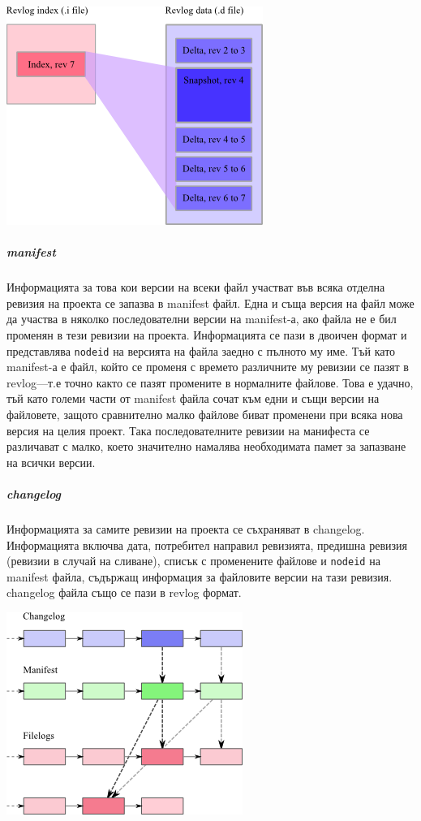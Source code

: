 \documentclass[a4paper]{article}
\begin{document}
    \includegraphics[scale=0.7]{hg_revlog}

    \subparagraph{manifest} Информацията за това кои версии на всеки файл
    участват във всяка отделна ревизия на проекта се запазва в manifest файл.
    Една и съща версия на файл може да участва в няколко последователни версии
    на manifest-а, ако файла не е бил променян в тези ревизии на проекта.
    Информацията се пази в двоичен формат и представлява \texttt{nodeid} на
    версията на файла заедно с пълното му име. Тъй като manifest-а е файл,
    който се променя с времето различните му ревизии се пазят в revlog---т.е
    точно както се пазят промените в нормалните файлове. Това е удачно, тъй
    като големи части от manifest файла сочат към едни и същи версии на
    файловете, защото сравнително малко файлове биват променени при всяка нова
    версия на целия проект. Така последователните ревизии на манифеста се
    различават с малко, което значително намалява необходимата памет за
    запазване на всички версии.

    \subparagraph{changelog}
    Информацията за самите ревизии на проекта се съхраняват в changelog.
    Информацията включва дата, потребител направил ревизията, предишна
    ревизия (ревизии в случай на сливане), списък с променените файлове
    и \texttt{nodeid} на manifest файла, съдържащ информация за файловите
    версии на тази ревизия. changelog файла също се пази в revlog формат.

    \vspace{10 mm}

    \includegraphics[scale=1.0]{hg_basics}
\end{document}
